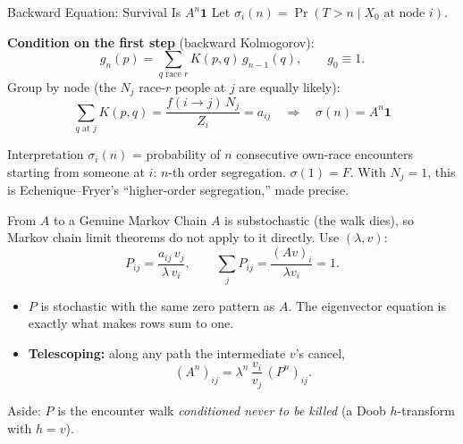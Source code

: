 \documentclass[aspectratio=169,10pt]{beamer}
\begin{document}
\begin{frame}[shrink=0]{Backward Equation: Survival Is $A^n\mathbf{1}$}
Let $\sigma_i(n) = \Pr(T > n \mid X_0 \text{ at node } i)$.
 
\vspace{0.15cm}
\textbf{Condition on the first step} (backward Kolmogorov):
\[
g_n(p) = \sum_{q \text{ race } r} K(p,q)\, g_{n-1}(q), \qquad g_0 \equiv 1.
\]
Group by node (the $N_j$ race-$r$ people at $j$ are equally likely):
\[
\sum_{q \text{ at } j} K(p,q) = \frac{f(i\to j)\,N_j}{Z_i} = a_{ij}
\quad\Longrightarrow\quad
\boxed{\sigma(n) = A^n\mathbf{1}}
\]
\begin{block}{Interpretation}
$\sigma_i(n)$ = probability of $n$ consecutive own-race encounters
starting from someone at $i$: \alert{$n$-th order segregation}.
$\sigma(1) = F$. With $N_j = 1$, this is Echenique--Fryer's
``higher-order segregation,'' made precise.
\end{block}
\end{frame}
 
\begin{frame}[shrink=0]{From $A$ to a Genuine Markov Chain}
$A$ is substochastic (the walk dies), so Markov chain limit theorems do
not apply to it directly. Use $(\lambda, v)$:
\[
P_{ij} = \frac{a_{ij}\, v_j}{\lambda\, v_i}, \qquad
\sum_j P_{ij} = \frac{(Av)_i}{\lambda v_i} = 1.
\]
\begin{itemize}
    \item $P$ is stochastic with the same zero pattern as $A$.
    The eigenvector equation is exactly what makes rows sum to one.
    \item \textbf{Telescoping:} along any path the intermediate $v$'s cancel,
    \[
    (A^n)_{ij} = \lambda^n\, \frac{v_i}{v_j}\, (P^n)_{ij}.
    \]
\end{itemize}
\vspace{0.1cm}
{\small Aside: $P$ is the encounter walk \emph{conditioned never to be
killed} (a Doob $h$-transform with $h = v$).}
\end{frame}
 
\end{document}
